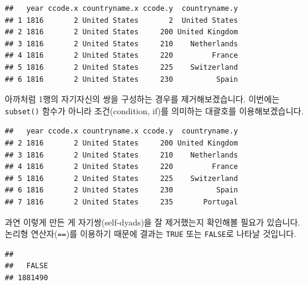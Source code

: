 \documentclass[]{book}
\newenvironment{Shaded}{\begin{snugshade}}{\end{snugshade}}
\newcommand{\KeywordTok}[1]{\textcolor[rgb]{0.13,0.29,0.53}{\textbf{#1}}}
\newcommand{\NormalTok}[1]{#1}
\newcommand{\OperatorTok}[1]{\textcolor[rgb]{0.81,0.36,0.00}{\textbf{#1}}}
\newcommand{\StringTok}[1]{\textcolor[rgb]{0.31,0.60,0.02}{#1}}
\begin{document}
\begin{verbatim}
##   year ccode.x countryname.x ccode.y  countryname.y
## 1 1816       2 United States       2  United States
## 2 1816       2 United States     200 United Kingdom
## 3 1816       2 United States     210    Netherlands
## 4 1816       2 United States     220         France
## 5 1816       2 United States     225    Switzerland
## 6 1816       2 United States     230          Spain
\end{verbatim}

아까처럼 1행의 자기자신의 쌍을 구성하는 경우를 제거해보겠습니다. 이번에는 \texttt{subset()} 함수가 아니라 조건(condition, if)를 의미하는 대괄호를 이용해보겠습니다.

\begin{Shaded}
\end{Shaded}

\begin{verbatim}
##   year ccode.x countryname.x ccode.y  countryname.y
## 2 1816       2 United States     200 United Kingdom
## 3 1816       2 United States     210    Netherlands
## 4 1816       2 United States     220         France
## 5 1816       2 United States     225    Switzerland
## 6 1816       2 United States     230          Spain
## 7 1816       2 United States     235       Portugal
\end{verbatim}

과연 이렇게 만든 게 자기쌍(self-dyads)을 잘 제거했는지 확인해볼 필요가 있습니다. 논리형 연산자(\texttt{==})를 이용하기 때문에 결과는 \texttt{TRUE} 또는 \texttt{FALSE}로 나타날 것입니다.

\begin{Shaded}
\end{Shaded}

\begin{verbatim}
## 
##   FALSE 
## 1881490
\end{verbatim}
\end{document}
